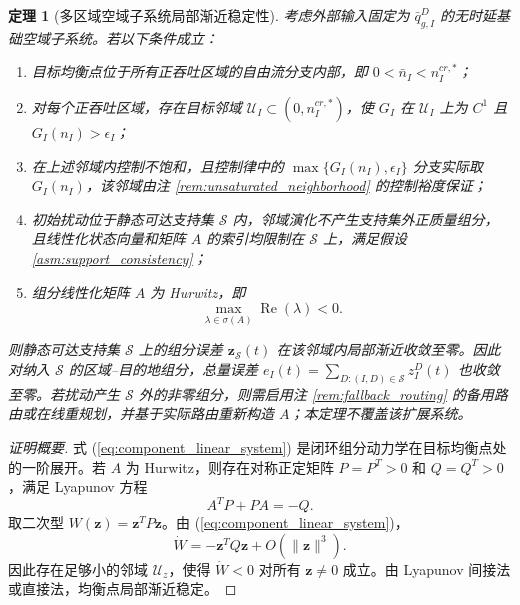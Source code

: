 \documentclass[a4paper,12pt]{article}
\theoremstyle{plain}
\newtheorem{theorem}{定理}[section]
\theoremstyle{definition}
\theoremstyle{remark}
\begin{document}
\begin{theorem}[多区域空域子系统局部渐近稳定性]\label{thm:multi_region_stability}
考虑外部输入固定为 $\bar q_{g,I}^D$ 的无时延基础空域子系统。若以下条件成立：
\begin{enumerate}
    \item 目标均衡点位于所有正吞吐区域的自由流分支内部，即 $0<\bar n_I<n_I^{cr,*}$；
    \item 对每个正吞吐区域，存在目标邻域 $\mathcal U_I\subset(0,n_I^{cr,*})$，使 $G_I$ 在 $\mathcal U_I$ 上为 $C^1$ 且 $G_I(n_I)>\epsilon_I$；
    \item 在上述邻域内控制不饱和，且控制律中的 $\max\{G_I(n_I),\epsilon_I\}$ 分支实际取 $G_I(n_I)$，该邻域由注 \ref{rem:unsaturated_neighborhood} 的控制裕度保证；
    \item 初始扰动位于静态可达支持集 $\mathcal S$ 内，邻域演化不产生支持集外正质量组分，且线性化状态向量和矩阵 $A$ 的索引均限制在 $\mathcal S$ 上，满足假设 \ref{asm:support_consistency}；
    \item 组分线性化矩阵 $A$ 为 Hurwitz，即
    \begin{equation}\label{eq:hurwitz_condition}
        \max_{\lambda\in\sigma(A)}\operatorname{Re}(\lambda)<0 .
    \end{equation}
\end{enumerate}
则静态可达支持集 $\mathcal S$ 上的组分误差 $\bm z_{\mathcal S}(t)$ 在该邻域内局部渐近收敛至零。因此对纳入 $\mathcal S$ 的区域--目的地组分，总量误差 $e_I(t)=\sum_{D:(I,D)\in\mathcal S} z_I^D(t)$ 也收敛至零。若扰动产生 $\mathcal S$ 外的非零组分，则需启用注 \ref{rem:fallback_routing} 的备用路由或在线重规划，并基于实际路由重新构造 $A$；本定理不覆盖该扩展系统。
\end{theorem}

\begin{proof}[证明概要]
式 (\ref{eq:component_linear_system}) 是闭环组分动力学在目标均衡点处的一阶展开。若 $A$ 为 Hurwitz，则存在对称正定矩阵 $P=P^T>0$ 和 $Q=Q^T>0$，满足 Lyapunov 方程
\begin{equation}\label{eq:component_lyapunov}
    A^T P+PA=-Q .
\end{equation}
取二次型 $W(\bm z)=\bm z^T P\bm z$。由 (\ref{eq:component_linear_system})，
\begin{equation}
    \dot W
    =
    -\bm z^T Q\bm z+O(\|\bm z\|^3).
\end{equation}
因此存在足够小的邻域 $\mathcal U_z$，使得 $\dot W<0$ 对所有 $\bm z\ne0$ 成立。由 Lyapunov 间接法或直接法，均衡点局部渐近稳定。
\end{proof}
\end{document}
